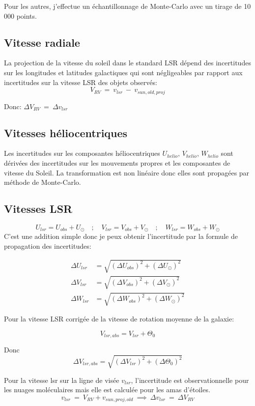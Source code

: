 \documentclass[a4paper, 11pt]{article}
\begin{document}
	Pour les autres, j'effectue un échantillonnage de Monte-Carlo avec un tirage de 10 000 points.
	\subsection*{Vitesse radiale}
	La projection de la vitesse du soleil dans le standard LSR dépend des incertitudes sur les longitudes et latitudes galactiques qui sont négligeables par rapport aux incertitudes sur la vitesse LSR des objets observés: 
	$$V_{RV} \ = \ v_{lsr} \ - \ v_{sun,old,proj}$$
	
	Donc: $\Delta V_{RV} \ = \ \Delta v_{lsr}$
	
	\subsection*{Vitesses héliocentriques}
	Les incertitudes sur les composantes héliocentriques $U_{helio}$, $V_{helio}$, $W_{helio}$ sont dérivées des incertitudes sur les mouvements propres et les composantes de vitesse du Soleil. La transformation est non linéaire donc elles sont propagées par méthode de Monte-Carlo.
	
	\subsection*{Vitesses LSR}
	\begin{equation}
		U_{lsr} = U_{obs} + U_{\odot} \quad ; \quad V_{lsr} = V_{obs} + V_{\odot} \quad ; \quad W_{lsr} = W_{obs} + W_{\odot}
	\end{equation}
	C'est une addition simple donc je peux obtenir l'incertitude par la formule de propagation des incertitudes:
	
	\begin{align}
		\Delta U_{lsr} &= \sqrt{(\Delta U_{obs})^2 + (\Delta U_{\odot})^2} \\
		\Delta V_{lsr} &= \sqrt{(\Delta V_{obs})^2 + (\Delta V_{\odot})^2} \\
		\Delta W_{lsr} &= \sqrt{(\Delta W_{obs})^2 + (\Delta W_{\odot})^2}
	\end{align}
	
	Pour la vitesse LSR corrigée de la vitesse de rotation moyenne de la galaxie: 
	
	$$V_{lsr,abs} = V_{lsr} + \Theta_0$$
	
	Donc $$\Delta V_{lsr,abs} = \sqrt{(\Delta V_{lsr})^2 + (\Delta \Theta_0)^2}$$
	
	Pour la vitesse lsr sur la ligne de visée $v_{lsr}$, l'incertitude est observationnelle pour les nuages moléculaires mais elle est calculée pour les amas d'étoiles.
	$$v_{lsr} \ = \ V_{RV} + v_{sun,proj,old} \ \implies \ \Delta v_{lsr} \ = \ \Delta V_{RV}$$  
	
\end{document}
